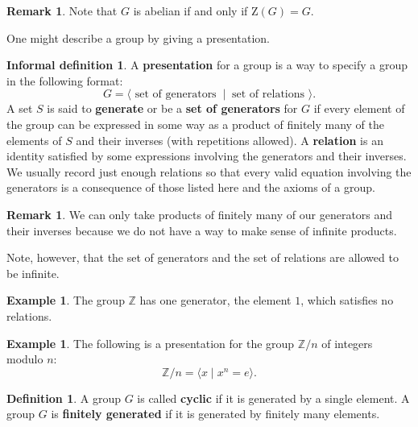 \documentclass[12pt]{report}
\numberwithin{equation}{section}
\numberwithin{theorem}{chapter}
\theoremstyle{definition}
\newtheorem{definition}[theorem]{Definition}
\newtheorem{fuzzydefn}[theorem]{Informal definition}
\newtheorem{example}[theorem]{Example}
\newtheorem*{basic properties}{Basic Properties}
\newtheorem*{Important Remark}{Important Remark}
\newtheorem{remark}[theorem]{Remark}
\begin{document}
\begin{remark}
	Note that $G$ is abelian if and only if $\mathrm{Z}(G) = G$.
\end{remark}



One might describe a group by giving a presentation.


\begin{fuzzydefn}
A {\bf presentation} for a group is a way to specify a group in the following format:
$$G=\langle \text{ set of generators } \ | \ \text{ set of relations } \rangle.$$
A set $S$ is said to {\bf generate} or be a {\bf set of generators} for $G$ if every element of the group can be expressed in some way as a product of finitely many of the elements of $S$ and their inverses (with repetitions allowed). 
A {\bf relation} is an identity satisfied by some expressions involving the generators and their inverses. We usually record just enough relations so that every valid equation involving the generators is a consequence of those listed here and the axioms of a group.
\end{fuzzydefn}


\begin{remark}
	We can only take products of finitely many of our generators and their inverses because we do not have a way to make sense of infinite products.
\end{remark}

Note, however, that the set of generators and the set of relations are allowed to be infinite.

\begin{example}
	The group $\mathbb{Z}$ has one generator, the element $1$, which satisfies no relations.
\end{example}

\begin{example}
	The following is a presentation for the group $\mathbb{Z}/n$ of integers modulo $n$:
	$$\mathbb{Z}/n = \langle x \mid x^n = e \rangle.$$
\end{example}



\begin{definition}
	A group $G$ is called {\bf cyclic} if it is generated by a single element. A group $G$ is {\bf finitely generated} if it is generated by finitely many elements.
\end{definition}
\end{document}
